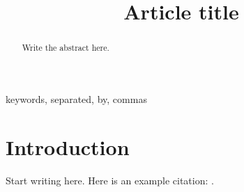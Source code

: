 \documentclass[conference]{IEEEtran}
\title{Article title}
\author{\IEEEauthorblockN{Author Name}
\IEEEauthorblockA{Institution\\
City, Country\\
author@example.org}}
\begin{document}
\maketitle

\begin{abstract}
Write the abstract here.
\end{abstract}

\begin{IEEEkeywords}
keywords, separated, by, commas
\end{IEEEkeywords}

\section{Introduction}
Start writing here. Here is an example citation: \cite{lamport1994}.



\end{document}
